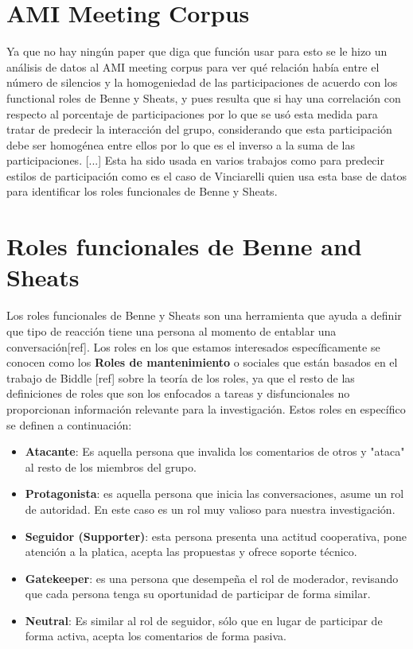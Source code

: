 \section{AMI Meeting Corpus}

Ya que no hay ningún paper que diga que función usar para esto se le hizo un análisis de datos al AMI meeting corpus para ver qué relación había entre el número de silencios y la homogeniedad de las participaciones de acuerdo con los functional roles de Benne y Sheats, y pues resulta que si hay una correlación con respecto al porcentaje de participaciones por lo que se usó esta medida para tratar de predecir la interacción del grupo, considerando que esta participación debe ser homogénea entre ellos por lo que es el inverso a la suma de las participaciones.
[...]
Esta ha sido usada en varios trabajos como para predecir estilos de participación como es el caso de Vinciarelli\cite{VinciarelliUnderstandingCorpus} quien usa esta base de datos para identificar los roles funcionales de Benne y Sheats\cite{benne_sheats}. 

\section{Roles funcionales de Benne and Sheats }
Los roles funcionales de Benne y Sheats son una herramienta que ayuda a definir que tipo de reacción tiene una persona al momento de entablar una conversación[ref]. Los roles en los que estamos interesados específicamente se conocen como los \textbf{Roles de mantenimiento} o sociales que están basados en el trabajo de Biddle [ref] sobre la teoría de los roles, ya que el resto de las definiciones de roles que son los enfocados a tareas y disfuncionales no proporcionan información relevante para la investigación. Estos roles en específico se definen a continuación:

\begin{itemize}\break

\item \textbf{Atacante}: Es aquella persona que invalida los comentarios de otros y "ataca" al resto de los miembros del grupo.
\item \textbf{Protagonista}: es aquella persona que inicia las conversaciones, asume un rol de autoridad. En este caso es un rol muy valioso para nuestra investigación.
\item \textbf{Seguidor (Supporter)}: esta persona presenta una actitud cooperativa, pone atención a la platica, acepta las propuestas y ofrece soporte técnico.
\item \textbf{Gatekeeper}: es una persona que desempeña el rol de moderador, revisando que cada persona tenga su oportunidad de participar de forma similar.
\item \textbf{Neutral}: Es similar al rol de seguidor, sólo que en lugar de participar de forma activa, acepta los comentarios de forma pasiva.
\end{itemize}

